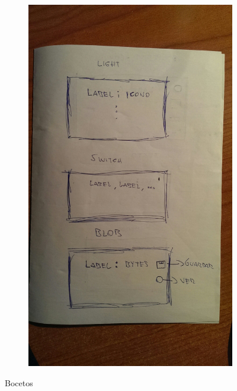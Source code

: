 \begin{figure}
\begin{subfigure}[]{0.4\textwidth}
        \caption{}
        \label{fig:boceto}
    \end{subfigure}
    \begin{subfigure}[]{0.4\textwidth}
        \includegraphics[width=\textwidth]{../images/boceto2.jpg}
        \caption{}
        \label{fig:boceto_2}
    \end{subfigure}
    \caption{Bocetos}\label{fig:bocetos}
\end{figure}

